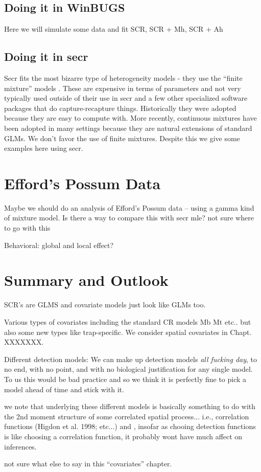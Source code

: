 \subsection{Doing it in WinBUGS}

Here we will simulate some data and fit SCR, SCR + Mh, SCR + Ah

\subsection{Doing it in secr}

Secr fits the most bizarre type of heterogeneity models - they use the
``finite mixture'' models \citep{norris_pollock:1996,
  pledger:2000}. These are expensive in terms of parameters and not
very typically used outside of their use in secr and a few other
specialized software packages that do capture-recapture
things. Historically they were adopted because they are easy to
compute with. More recently, continuous mixtures have been adopted in
many settings because they are natural extensions of standard GLMs. We
don't favor the use of finite mixtures. Despite this we give some
examples here using secr.


\section{Efford's Possum Data}

Maybe we should do an analysis of Efford's Possum data -- using a
gamma kind of mixture model.  Is there a way to compare this with secr
mle?
not sure where to go with this


Behavioral: global and local effect?


\section{Summary and Outlook}


SCR's are GLMS and covariate models just look like GLMs too.

Various types of covariates including the standard CR models Mb Mt etc..
but also some new types like trap-specific. We consider spatial covariates
in Chapt. XXXXXXX.


Different detection models: We can make up detection models {\it all fucking
day}, to no end, with no point, and with no biological justification for
any single model. To us this would be bad practice and so we think it is
perfectly fine to pick a model ahead of time and stick with it.

we note that underlying these different models is basically something
to do with the 2nd moment structure of some correlated spatial process...
i.e., correlation functions (Higdon et al. 1998; etc...) and , insofar
as chooing detection functions is like choosing a correlation function,
it probably wont have much affect on inferences.



not sure what else to say in this ``covariates'' chapter.



